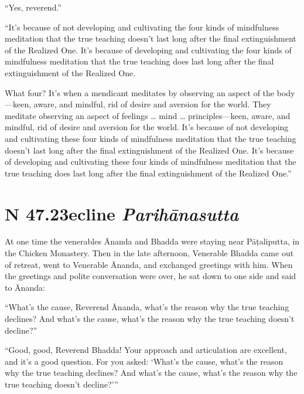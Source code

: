 \documentclass[12pt,openany]{book}%
\newcommand*{\suttatitleacronym}[1]{\smaller[2]{#1}\vspace*{.3em}}
\newcommand*{\suttatitletranslation}[1]{\linebreak{#1}}
\newcommand*{\suttatitleroot}[1]{\linebreak\smaller[2]\itshape{#1}}
\newcommand*{\tocacronym}[1]{\hspace*{-3.3em}{#1}\quad}
\newcommand*{\toctranslation}[1]{#1}
\newcommand*{\tocroot}[1]{(\textit{#1})}
\begin{document}
“Yes, reverend.” 

“It’s because of not developing and cultivating the four kinds of mindfulness meditation that the true teaching doesn’t last long after the final extinguishment of the Realized One. It’s because of developing and cultivating the four kinds of mindfulness meditation that the true teaching does last long after the final extinguishment of the Realized One. 

What four? It’s when a mendicant meditates by observing an aspect of the body—keen, aware, and mindful, rid of desire and aversion for the world. They meditate observing an aspect of feelings … mind … principles—keen, aware, and mindful, rid of desire and aversion for the world. It’s because of not developing and cultivating these four kinds of mindfulness meditation that the true teaching doesn’t last long after the final extinguishment of the Realized One. It’s because of developing and cultivating these four kinds of mindfulness meditation that the true teaching does last long after the final extinguishment of the Realized One.” 

%
\section*{{\suttatitleacronym SN 47.23}{\suttatitletranslation Decline }{\suttatitleroot Parihānasutta}}
\addcontentsline{toc}{section}{\tocacronym{SN 47.23} \toctranslation{Decline } \tocroot{Parihānasutta}}

At one time the venerables Ānanda and Bhadda were staying near \textsanskrit{Pāṭaliputta}, in the Chicken Monastery. Then in the late afternoon, Venerable Bhadda came out of retreat, went to Venerable Ānanda, and exchanged greetings with him. When the greetings and polite conversation were over, he sat down to one side and said to Ānanda: 

“What’s the cause, Reverend Ānanda, what’s the reason why the true teaching declines? And what’s the cause, what’s the reason why the true teaching doesn’t decline?” 

“Good, good, Reverend Bhadda! Your approach and articulation are excellent, and it’s a good question. For you asked: ‘What’s the cause, what’s the reason why the true teaching declines? And what’s the cause, what’s the reason why the true teaching doesn’t decline?’” 
\end{document}

